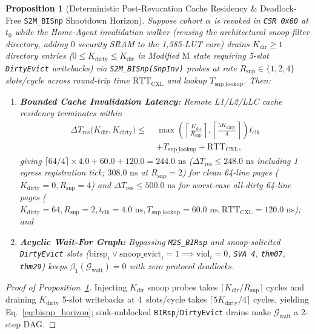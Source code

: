 \documentclass[11pt,letterpaper]{article}
\providecommand{\CoreClbLuts}{1,585}
\providecommand{\CorePhysicalLUTs}{\CoreClbLuts}
\theoremstyle{spectralthm}
\newtheorem{proposition}[theorem]{Proposition}
\begin{document}
\begin{proposition}[Deterministic Post-Revocation Cache Residency \& Deadlock-Free \texttt{S2M\_BISnp} Shootdown Horizon]
\label{prop:bisnp_shootdown}
Suppose cohort $\alpha$ is revoked in \texttt{CSR 0x60} at $t_0$ while the Home-Agent invalidation walker (reusing the architectural snoop-filter directory, adding $0$ security SRAM to the \CorePhysicalLUTs-LUT core) drains $K_{\mathrm{dir}} \ge 1$ directory entries ($0 \le K_{\mathrm{dirty}} \le K_{\mathrm{dir}}$ in Modified $\mathrm{M}$ state requiring 5-slot \texttt{DirtyEvict} writebacks) via \texttt{S2M\_BISnp(SnpInv)} probes at rate $R_{\mathrm{snp}} \in \{1,2,4\}$ slots/cycle across round-trip time $\mathrm{RTT}_{\mathrm{CXL}}$ and lookup $T_{\mathrm{snp\_lookup}}$. Then:
\begin{enumerate}
  \item[(i)] \textbf{Bounded Cache Invalidation Latency:} Remote L1/L2/LLC cache residency terminates within
  \begin{equation}
  \label{eq:bisnp_horizon}
  \begin{aligned}
  \Delta T_{\mathrm{res}}\bigl(K_{\mathrm{dir}}, K_{\mathrm{dirty}}\bigr)
  \le\;& \max\!\left(\left\lceil \frac{K_{\mathrm{dir}}}{R_{\mathrm{snp}}} \right\rceil, \left\lceil \frac{5 K_{\mathrm{dirty}}}{4} \right\rceil\right) t_{\mathrm{clk}}\\
  &+ T_{\mathrm{snp\_lookup}} + \mathrm{RTT}_{\mathrm{CXL}},
  \end{aligned}
  \end{equation}
  giving $\lceil 64/4\rceil\times 4.0 + 60.0 + 120.0 = 244.0\text{~ns}$ ($\Delta T_{\mathrm{res}} \le 248.0\text{~ns}$ including 1 egress registration tick; $308.0\text{~ns}$ at $R_{\mathrm{snp}}=2$) for clean 64-line pages ($K_{\mathrm{dirty}}=0, R_{\mathrm{snp}}=4$) and $\Delta T_{\mathrm{res}} \le 500.0\text{~ns}$ for worst-case all-dirty 64-line pages ($K_{\mathrm{dirty}}=64, R_{\mathrm{snp}}=2, t_{\mathrm{clk}}=4.0\text{~ns}, T_{\mathrm{snp\_lookup}}=60.0\text{~ns}, \mathrm{RTT}_{\mathrm{CXL}}=120.0\text{~ns}$); and
  \item[(ii)] \textbf{Acyclic Wait-For Graph:} Bypassing \texttt{M2S\_BIRsp} and snoop-solicited \texttt{DirtyEvict} slots ($\mathrm{birsp}_i \vee \mathrm{snoop\_evict}_i = 1 \implies \mathrm{viol}_i = 0$, \texttt{SVA 4}, \texttt{thm07}, \texttt{thm29}) keeps $\beta_1(\mathcal{G}_{\mathrm{wait}}) = 0$ with zero protocol deadlocks.
\end{enumerate}
\end{proposition}
\begin{proof}[Proof of Proposition~\ref{prop:bisnp_shootdown}]
Injecting $K_{\mathrm{dir}}$ snoop probes takes $\lceil K_{\mathrm{dir}}/R_{\mathrm{snp}} \rceil$ cycles and draining $K_{\mathrm{dirty}}$ 5-slot writebacks at 4~slots/cycle takes $\lceil 5 K_{\mathrm{dirty}}/4 \rceil$ cycles, yielding Eq.~\eqref{eq:bisnp_horizon}; sink-unblocked \texttt{BIRsp}/\texttt{DirtyEvict} drains make $\mathcal{G}_{\mathrm{wait}}$ a 2-step DAG.
\end{proof}
\end{document}

